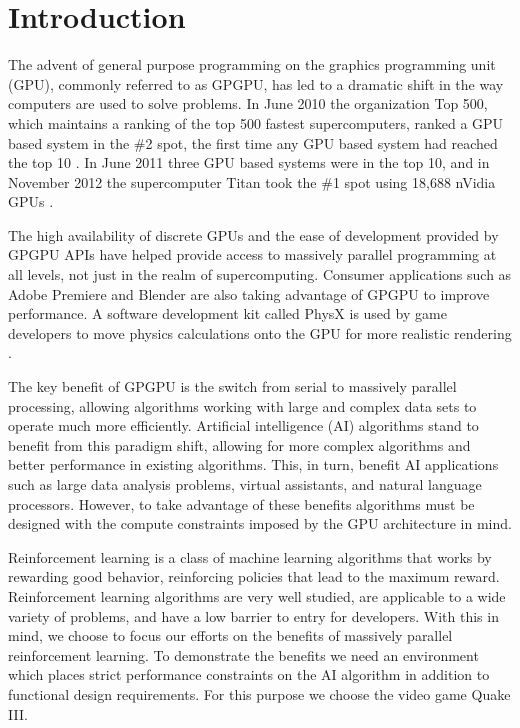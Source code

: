 \chapter{Introduction}
\label{chap:introduction}

The advent of general purpose programming on the graphics programming unit (GPU), commonly referred to as GPGPU, has led to a dramatic shift in the way computers are used to solve problems. In June 2010 the organization Top 500, which maintains a ranking of the top 500 fastest supercomputers, ranked a GPU based system in the \#2 spot, the first time any GPU based system had reached the top 10 \cite{top500:2010}. In June 2011 three GPU based systems were in the top 10, and in November 2012 the supercomputer Titan took the \#1 spot using 18,688 nVidia GPUs \cite{top500:2011} \cite{top500:2012}.

The high availability of discrete GPUs and the ease of development provided by GPGPU APIs have helped provide access to massively parallel programming at all levels, not just in the realm of supercomputing. Consumer applications such as Adobe Premiere \cite{adobe} and Blender \cite{blender} are also taking advantage of GPGPU to improve performance. A software development kit called PhysX is used by game developers to move physics calculations onto the GPU for more realistic rendering \cite{physx}.

The key benefit of GPGPU is the switch from serial to massively parallel processing, allowing algorithms working with large and complex data sets to operate much more efficiently. Artificial intelligence (AI) algorithms stand to benefit from this paradigm shift, allowing for more complex algorithms and better performance in existing algorithms. This, in turn, benefit AI applications such as large data analysis problems, virtual assistants, and natural language processors. However, to take advantage of these benefits algorithms must be designed with the compute constraints imposed by the GPU architecture in mind.

Reinforcement learning is a class of machine learning algorithms that works by rewarding good behavior, reinforcing policies that lead to the maximum reward. Reinforcement learning algorithms are very well studied, are applicable to a wide variety of problems, and have a low barrier to entry for developers. With this in mind, we choose to focus our efforts on the benefits of massively parallel reinforcement learning. To demonstrate the benefits we need an environment which places strict performance constraints on the AI algorithm in addition to functional design requirements. For this purpose we choose the video game Quake III.

